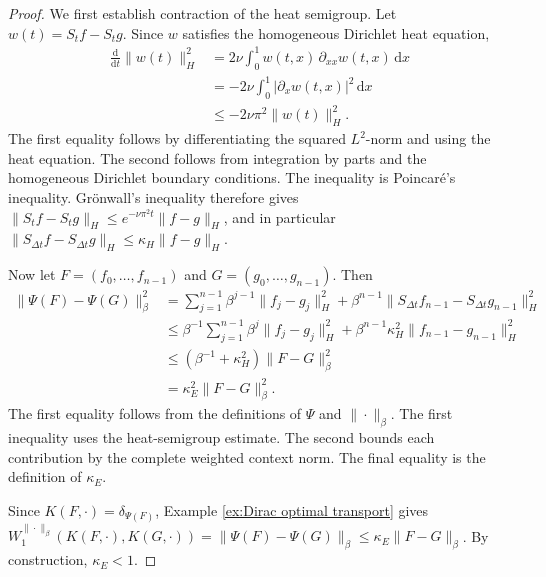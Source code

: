 \begin{proof}
We first establish contraction of the heat semigroup. Let \(w(t)=S_tf-S_tg\). Since \(w\) satisfies the homogeneous Dirichlet heat equation,
\[
\begin{aligned}
\frac{\mathrm d}{\mathrm dt}
\|w(t)\|_H^2
&=
2\nu
\int_0^1
w(t,x)\,
\partial_{xx}w(t,x)\,
\mathrm dx
\\
&=
-2\nu
\int_0^1
|\partial_xw(t,x)|^2
\,\mathrm dx
\\
&\leqslant
-2\nu\pi^2
\|w(t)\|_H^2.
\end{aligned}
\]
The first equality follows by differentiating the squared \(L^2\)-norm and using the heat equation. The second follows from integration by parts and the homogeneous Dirichlet boundary conditions. The inequality is Poincaré's inequality. Grönwall's inequality therefore gives \(\|S_tf-S_tg\|_H\leqslant e^{-\nu\pi^2t}\|f-g\|_H\), and in particular \(\|S_{\Delta t}f-S_{\Delta t}g\|_H\leqslant\kappa_H\|f-g\|_H\).

Now let \(F=(f_0,\ldots,f_{n-1})\) and \(G=(g_0,\ldots,g_{n-1})\). Then
\[
\begin{aligned}
\|\Psi(F)-\Psi(G)\|_\beta^2
&=
\sum_{j=1}^{n-1}
\beta^{j-1}
\|f_j-g_j\|_H^2
+
\beta^{n-1}
\|S_{\Delta t}f_{n-1}-S_{\Delta t}g_{n-1}\|_H^2
\\
&\leqslant
\beta^{-1}
\sum_{j=1}^{n-1}
\beta^j
\|f_j-g_j\|_H^2
+
\beta^{n-1}
\kappa_H^2
\|f_{n-1}-g_{n-1}\|_H^2
\\
&\leqslant
\left(
\beta^{-1}+\kappa_H^2
\right)
\|F-G\|_\beta^2
\\
&=
\kappa_E^2
\|F-G\|_\beta^2.
\end{aligned}
\]
The first equality follows from the definitions of \(\Psi\) and \(\|\cdot\|_\beta\). The first inequality uses the heat-semigroup estimate. The second bounds each contribution by the complete weighted context norm. The final equality is the definition of \(\kappa_E\).

Since \(K(F,\cdot)=\delta_{\Psi(F)}\), Example \ref{ex:Dirac optimal transport} gives \(W_1^{\|\cdot\|_\beta}(K(F,\cdot),K(G,\cdot))=\|\Psi(F)-\Psi(G)\|_\beta\leqslant\kappa_E\|F-G\|_\beta\). By construction, \(\kappa_E<1\).


\end{proof}
